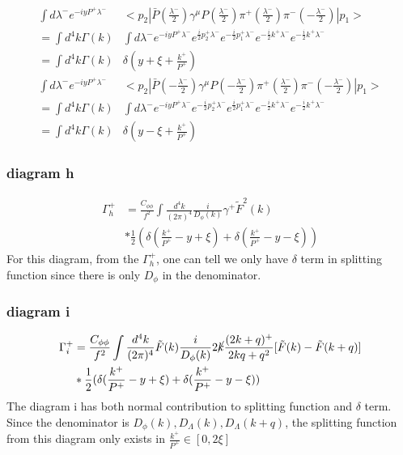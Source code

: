 \documentclass[preprintnumbers,prd,superscriptaddress,preprint]{revtex4-1}
\begin{document}
	\begin{align*}
		\int d\lambda^{-}e^{-iyP^{+}\lambda^{-}} & <p_{2}|\bar{P}(\frac{\lambda^{-}}{2})\gamma^{\mu}P(\frac{\lambda^{-}}{2})\pi^{+}(\frac{\lambda^{-}}{2})\pi^{-}(-\frac{\lambda^{-}}{2})|p_{1}>\\
		=\int d^{4}k\Gamma(k) & \int d\lambda^{-}e^{-iyP^{+}\lambda^{-}}e^{\frac{i}{2}p_{2}^{+}\lambda^{-}}e^{-\frac{i}{2}p_{1}^{+}\lambda^{-}}e^{-\frac{i}{2}k^{+}\lambda^{-}}e^{-\frac{i}{2}k^{+}\lambda^{-}}\\
		=\int d^{4}k\Gamma(k) & \delta(y+\xi+\frac{k^{+}}{P^{+}})\\
		\int d\lambda^{-}e^{-iyP^{+}\lambda^{-}} & <p_{2}|\bar{P}(-\frac{\lambda^{-}}{2})\gamma^{\mu}P(-\frac{\lambda^{-}}{2})\pi^{+}(\frac{\lambda^{-}}{2})\pi^{-}(-\frac{\lambda^{-}}{2})|p_{1}>\\
		=\int d^{4}k\Gamma(k) & \int d\lambda^{-}e^{-iyP^{+}\lambda^{-}}e^{-\frac{i}{2}p_{2}^{+}\lambda^{-}}e^{\frac{i}{2}p_{1}^{+}\lambda^{-}}e^{-\frac{i}{2}k^{+}\lambda^{-}}e^{-\frac{i}{2}k^{+}\lambda^{-}}\\
		=\int d^{4}k\Gamma(k) & \delta(y-\xi+\frac{k^{+}}{P^{+}})
	\end{align*}
	
	\subsubsection{diagram h}
	
	\begin{align*}
		\Gamma_{h}^{+} & =\frac{C_{\phi\phi}}{f^{2}}\int\frac{d^{4}k}{(2\pi)^{4}}\frac{i}{D_{\phi}(k)}\gamma^{+}\tilde{F}^{2}(k)\\
		& *\frac{1}{2}(\delta(\frac{k^{+}}{P^{+}}-y+\xi)+\delta(\frac{k^{+}}{P^{+}}-y-\xi))
	\end{align*}
	For this diagram, from the $\Gamma_{h}^{+}$, one can tell we only have $\delta$ term in splitting function since there is only $D_{\phi}$ in the denominator.  
	
	\subsubsection{diagram i}
	
	\begin{align*}
		\Gamma_{i}^{+} & =\frac{C_{\phi\phi}}{f^{2}}\int\frac{d^{4}k}{(2\pi)^{4}}\tilde{F}(k)\frac{i}{D_{\phi}(k)}2\cancel{k}\frac{(2k+q)^{+}}{2kq+q^{2}}[\tilde{F}(k)-\tilde{F}(k+q)]\\
		& *\frac{1}{2}(\delta(\frac{k^{+}}{P^{+}}-y+\xi)+\delta(\frac{k^{+}}{P^{+}}-y-\xi))
	\end{align*}
	The diagram i has both normal contribution to splitting function and $\delta$ term. Since the denominator is $D_{\phi}(k),D_{\Lambda}(k),D_{\Lambda}(k+q)$, the splitting function from this diagram only exists in $\frac{k^{+}}{P^{+}}\in [0,2\xi]$
	
\end{document}
